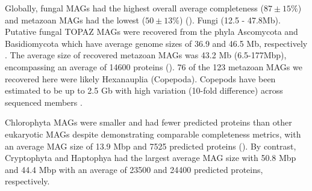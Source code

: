 \documentclass[12pt]{article}
\numberwithin{equation}{section}
\begin{document}
Globally, fungal MAGs had the highest overall average completeness ($87 \pm 15\%$) and metazoan MAGs had the lowest ($50 \pm 13\%$) (). Fungi (12.5 - 47.8Mb). Putative fungal TOPAZ MAGs were recovered from the phyla Ascomycota and Basidiomycota which have average genome sizes of 36.9 and 46.5 Mb, respectively \citep{Mohanta_2015}. The average size of recovered metazoan MAGs was 43.2 Mb (6.5-177Mbp), encompassing an average of 14600 proteins (). 76 of the 123 metazoan MAGs we recovered here were likely Hexanauplia (Copepoda). Copepods have been estimated to be up to 2.5 Gb with high variation (10-fold difference) across sequenced members \citep{Jorgensen_2019}.  

Chlorophyta MAGs were smaller and had fewer predicted proteins than other eukaryotic MAGs despite demonstrating comparable completeness metrics, with an average MAG size of 13.9 Mbp and 7525 predicted proteins (). By contrast, Cryptophyta and Haptophya had the largest average MAG size with 50.8 Mbp and 44.4 Mbp with an average of 23500 and 24400 predicted proteins, respectively.
\end{document}
